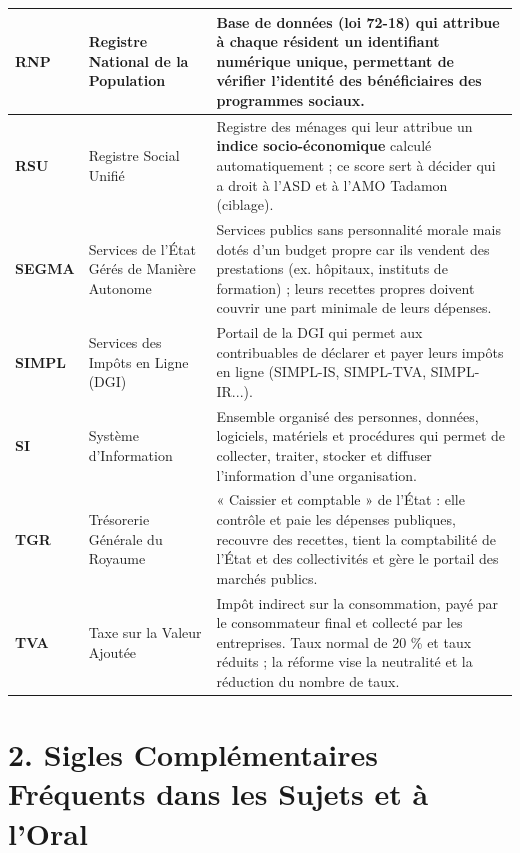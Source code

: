 {\begin{longtable}{|p{1.8cm}|p{4.9cm}|p{8.8cm}|}
\textbf{RNP} & Registre National de la Population & Base de données (loi 72-18) qui attribue à chaque résident un identifiant numérique unique, permettant de vérifier l'identité des bénéficiaires des programmes sociaux. \\ \hline
\textbf{RSU} & Registre Social Unifié & Registre des ménages qui leur attribue un \textbf{indice socio-économique} calculé automatiquement ; ce score sert à décider qui a droit à l'ASD et à l'AMO Tadamon (ciblage). \\ \hline
\textbf{SEGMA} & Services de l'État Gérés de Manière Autonome & Services publics sans personnalité morale mais dotés d'un budget propre car ils vendent des prestations (ex. hôpitaux, instituts de formation) ; leurs recettes propres doivent couvrir une part minimale de leurs dépenses. \\ \hline
\textbf{SIMPL} & Services des Impôts en Ligne (DGI) & Portail de la DGI qui permet aux contribuables de déclarer et payer leurs impôts en ligne (SIMPL-IS, SIMPL-TVA, SIMPL-IR...). \\ \hline
\textbf{SI} & Système d'Information & Ensemble organisé des personnes, données, logiciels, matériels et procédures qui permet de collecter, traiter, stocker et diffuser l'information d'une organisation. \\ \hline
\textbf{TGR} & Trésorerie Générale du Royaume & « Caissier et comptable » de l'État : elle contrôle et paie les dépenses publiques, recouvre des recettes, tient la comptabilité de l'État et des collectivités et gère le portail des marchés publics. \\ \hline
\textbf{TVA} & Taxe sur la Valeur Ajoutée & Impôt indirect sur la consommation, payé par le consommateur final et collecté par les entreprises. Taux normal de 20 \% et taux réduits ; la réforme vise la neutralité et la réduction du nombre de taux. \\ \hline
\end{longtable}
}

\section*{2. Sigles Complémentaires Fréquents dans les Sujets et à l'Oral}

